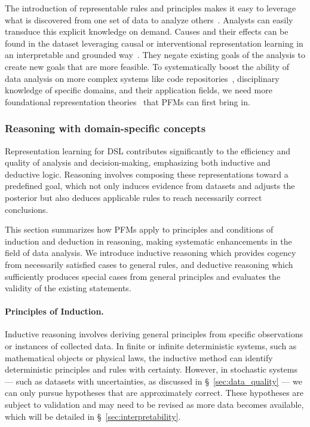 The introduction of representable rules and principles makes it easy to leverage what is discovered from one set of data to analyze others~\cite{yuan2023power}. Analysts can easily transduce this explicit knowledge on demand. Causes and their effects can be found in the dataset leveraging causal or interventional representation learning in an interpretable and grounded way~\cite{ahuja2023interventional}. They negate existing goals of the analysis to create new goals that are more feasible. To systematically boost the ability of data analysis on more complex systems like code repositories~\cite{jain2024r2e}, disciplinary knowledge of specific domains, and their application fields, we need more foundational representation theories~\cite{yuan2023power} that PFMs can first bring in. 
  
  
\subsubsection{Reasoning with domain-specific concepts}\label{sec:reasoning}
  

Representation learning for DSL contributes significantly to the efficiency and quality of analysis and decision-making, emphasizing both inductive and deductive logic. Reasoning involves composing these representations toward a predefined goal, which not only induces evidence from datasets and adjusts the posterior but also deduces applicable rules to reach necessarily correct conclusions. 
  
This section summarizes how PFMs apply to principles and conditions of induction and deduction in reasoning, making systematic enhancements in the field of data analysis. We introduce inductive reasoning which provides cogency from necessarily satisfied cases to general rules, and deductive reasoning which sufficiently produces special cases from general principles and evaluates the validity of the existing statements.
  
\paragraph{Principles of Induction.} Inductive reasoning involves deriving general principles from specific observations or instances of collected data. In finite or infinite deterministic systems, such as mathematical objects or physical laws, the inductive method can identify deterministic principles and rules with certainty. However, in stochastic systems — such as datasets with uncertainties, as discussed in \S~\ref{sec:data_quality} — we can only pursue hypotheses that are approximately correct. These hypotheses are subject to validation and may need to be revised as more data becomes available, which will be detailed in \S~\ref{sec:interpretability}.
  
